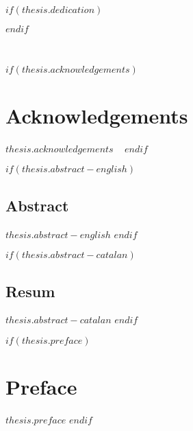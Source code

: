 \begin{spacing}{1.5}


$if(thesis.dedication)$
\clearpage
 \begin{flushleft}%
  \thispagestyle{empty}
  \normalsize\itshape{}
\end{flushleft}
\clearpage
$endif$


\clearpage
~
\thispagestyle{empty}
\clearpage


$if(thesis.acknowledgements)$
\clearpage
\chapter*{\sffamily Acknowledgements}
\vspace*{\baselineskip}
\normalsize{$thesis.acknowledgements$}
\clearpage
~
$endif$

\thispagestyle{empty}


$if(thesis.abstract-english)$
\clearpage
\section*{\sffamily Abstract}
\normalsize{$thesis.abstract-english$}
\vspace*{\baselineskip}
\clearpage
$endif$


$if(thesis.abstract-catalan)$
\clearpage
\section*{\sffamily Resum}
\normalsize{$thesis.abstract-catalan$}
\afterpage{\blankpage}
\clearpage
$endif$



$if(thesis.preface)$
\clearpage
\chapter*{\sffamily Preface}
\vspace*{\baselineskip}
\normalsize{$thesis.preface$}
\clearpage
$endif$

\end{spacing}
